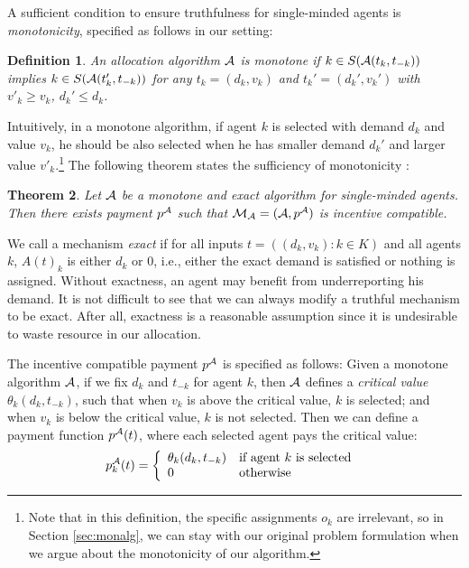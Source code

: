 \documentclass{aamas2013}
\newtheorem{theorem}{Theorem}[section]
\newtheorem{definition}[theorem]{Definition}
\begin{document}
A sufficient condition to ensure truthfulness for single-minded agents is {\em monotonicity}, specified as follows in our setting:

\begin{definition}\label{def:mon}
An allocation algorithm ${\cal A}$ is {\em monotone} if $k\in S({\cal A}(t_k,t_{-k}))$ implies $k\in S({\cal A}(t_k',t_{-k}))$ for any $t_k=(d_k,v_k)$ and $t_k'=(d_k',v_k')$ with $v'_k \ge v_k$, ${d}_k' \le d_k$. 
\end{definition}
Intuitively, in a monotone algorithm, if agent $k$ is selected with demand $d_k$ and value $v_k$, he should be also selected when he has smaller demand ${d}_k'$ and larger value $v'_k$.\footnote{Note that in this definition, the specific assignments $o_k$ are irrelevant, so in Section \ref{sec:monalg}, we can stay with our original problem formulation when we argue about the monotonicity of our algorithm.}  
The following theorem states the sufficiency of monotonicity \cite{BKV05KS,LOS99mono}:
\begin{theorem}
\label{thm:IC}
Let ${\cal A}$ be a monotone and exact algorithm for single-minded agents.  Then there exists payment $p^{\cal A}$ such that ${\cal M}_{\cal A}=({\cal A},p^{\cal A})$ is incentive compatible.
\end{theorem}

We call a mechanism {\em exact} if for all inputs $t=((d_k,v_k):k\in K)$ and all agents $k$, $A(t)_k$ is either $d_k$ or $0$, i.e., either the exact demand is satisfied or nothing is assigned.  Without exactness, an agent may benefit from underreporting his demand.  It is not difficult to see that we can always modify a truthful mechanism to be exact.  After all, exactness is a reasonable assumption since it is undesirable to waste resource in our allocation.     

The incentive compatible payment $p^{\cal A}$ is specified as follows:
Given a monotone algorithm ${\cal A}$, if we fix $d_k$ and $t_{-k}$ for agent $k$, then ${\cal A}$ defines a {\em critical value} $\theta_k(d_k, t_{-k})$, such that when $v_k$ is above the critical value, $k$ is selected; and when $v_k$ is below the critical value, $k$ is not selected.  Then we can define a payment function $p^{\cal A}(t)$, where each selected agent pays the critical value: \begin{equation*} 
p_k^{\cal A}(t)= 
\left\{
\begin{array}{ll}
\theta_k(d_k,t_{-k}) & \mbox{if agent $k$ is selected\ } \\
0 & \mbox{otherwise\ }  \\
\end{array} 
\right.  
\end{equation*} 
\end{document}
